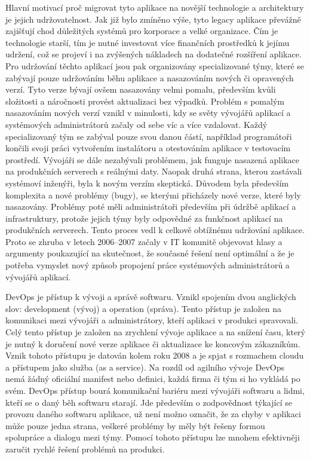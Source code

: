 Hlavní motivací proč migrovat tyto aplikace na novější technologie a architektury je jejich udržovatelnost. Jak již bylo zmíněno výše, tyto legacy aplikace převážně zajišťují chod důležitých systémů pro korporace a velké organizace. Čím je technologie starší, tím je nutné investovat více finančních prostředků k jejímu udržení, což se projeví i na zvýšených nákladech na dodatečné rozšíření aplikace. Pro udržování těchto aplikací jsou pak organizovány specializované týmy, které se zabývají pouze udržováním běhu aplikace a nasazováním nových či opravených verzí. Tyto verze bývají ovšem nasazovány velmi pomalu, především kvůli složitosti a náročnosti provést aktualizaci bez výpadků. Problém s pomalým nasazováním nových verzí vznikl v minulosti, kdy se světy vývojářů aplikací a systémových administrátorů začaly od sebe víc a více vzdalovat. Každý specializovaný tým se zabýval pouze svou danou částí, například programátoři končili svoji práci vytvořením instalátoru a otestováním aplikace v testovacím prostředí. Vývojáři se dále nezabývali problémem, jak funguje nasazená aplikace na produkčních serverech s reálnými daty. Naopak druhá strana, kterou zastávali systémoví inženýři, byla k novým verzím skeptická. Důvodem byla především komplexita a nové problémy (bugy), se kterými přicházely nové verze, které byly nasazovány. Problémy poté měli administrátoři především při údržbě aplikací a infrastruktury, protože jejich týmy byly odpovědné za funkčnost aplikací na produkčních serverech. Tento proces vedl k celkově obtížnému udržování aplikace. Proto se zhruba v letech 2006–2007 začaly v IT komunitě objevovat hlasy a argumenty poukazující na skutečnost, že současné řešení není optimální a že je potřeba vymyslet nový způsob propojení práce systémových administrátorů a vývojářů aplikací.

DevOps je přístup k vývoji a správě softwaru. Vznikl spojením dvou anglických slov: development (vývoj) a operation (správa). Tento přístup je založen na komunikaci mezi vývojáři a administrátory, kteří aplikaci v produkci spravovali. Celý tento přístup je založen na zrychlení vývoje aplikace a na snížení času, který je nutný k doručení nové verze aplikace či aktualizace ke koncovým zákazníkům. Vznik tohoto přístupu je datován kolem roku 2008 a je spjat s rozmachem cloudu a přístupem jako služba (as a service). Na rozdíl od agilního vývoje DevOps nemá žádný oficiální manifest nebo definici, každá firma či tým si ho vykládá po svém. DevOps přístup bourá komunikační bariéru mezi vývojáři softwaru a lidmi, kteří se o daný běh softwaru starají. Jde především o zodpovědnost týkající se provozu daného softwaru aplikace, už není možno označit, že za chyby v aplikaci může pouze jedna strana, veškeré problémy by měly být řešeny formou spolupráce a dialogu mezi týmy. Pomocí tohoto přístupu lze mnohem efektivněji zaručit rychlé řešení problémů na produkci.

